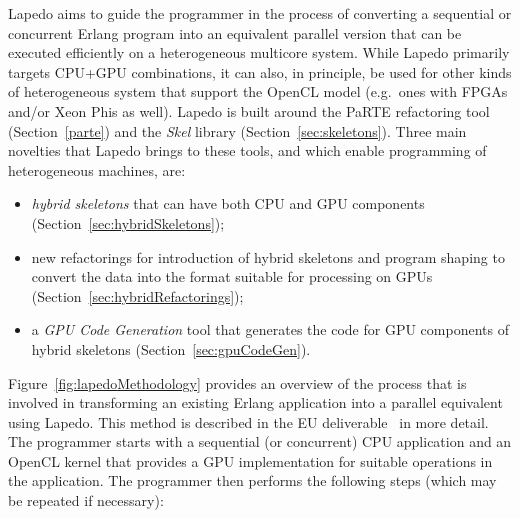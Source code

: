 \documentclass[final]{jfp1}
\newcommand{\lapedo}{\xspace{\sc Lapedo}\xspace}
\newcommand{\Lapedo}{\lapedo}
\begin{document}
\Lapedo{} aims to guide the programmer in the process of converting a
sequential or concurrent Erlang program into an equivalent parallel
version that can be executed efficiently on a heterogeneous multicore
system.  While \Lapedo{} primarily targets CPU+GPU combinations, it can
also, in principle, be used for other kinds of heterogeneous system that
support the OpenCL model (e.g.\ ones with FPGAs and/or Xeon Phis as well). \Lapedo{}
is built around the PaRTE refactoring tool (Section~\ref{parte}) and the \emph{Skel} 
library (Section~\ref{sec:skeletons}). Three main novelties that \Lapedo{} brings to these
tools, and which enable programming of heterogeneous machines, are: 
\begin{itemize} 
\item \emph{hybrid skeletons} that can have both CPU and GPU components 
(Section~\ref{sec:hybridSkeletons});
\item new refactorings for introduction of hybrid skeletons and program shaping
to convert the data into the format suitable for processing on GPUs 
(Section~\ref{sec:hybridRefactorings}); 
\item a \emph{GPU Code Generation} tool
that generates the code for GPU components of hybrid skeletons (Section~\ref{sec:gpuCodeGen}).
\end{itemize}
%
Figure~\ref{fig:lapedoMethodology} provides an overview of the process 
that is involved in transforming an existing Erlang application into a
parallel equivalent using \Lapedo{}. This method is described in the EU deliverable~\cite{transformationsystem} in more detail.
The programmer starts with a sequential (or concurrent) CPU application and an OpenCL kernel that
provides a GPU implementation for suitable operations in the application.
The programmer then performs the following steps (which may be  repeated if necessary):
\end{document}
